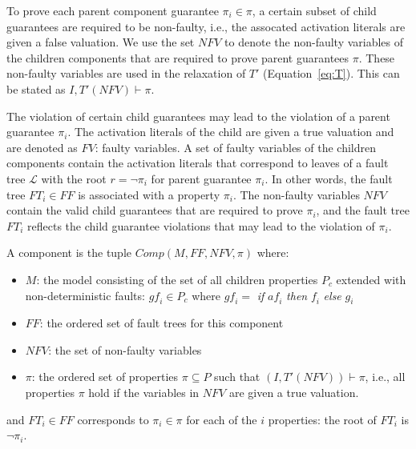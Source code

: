 
To prove each parent component guarantee $\pi_i \in \pi$, a certain subset of child guarantees are required to be non-faulty, i.e., the assocated activation literals are given a false valuation. We use the set $\mathit{NFV}$ to denote the non-faulty variables of the children components that are required to prove parent guarantees $\pi$.  These non-faulty variables are used in the relaxation of $T'$ (Equation~\ref{eq:T}). This can be stated as $I,T'(\mathit{NFV}) \vdash \pi$. 

The violation of certain child guarantees may lead to the violation of a parent guarantee $\pi_i$. The activation literals of the child are given a true valuation and are denoted as $\mathit{FV}$: faulty variables. A set of faulty variables of the children components contain the activation literals that correspond to leaves of a fault tree $\mathcal{L}$ with the root $r = \neg \pi_i$ for parent guarantee $\pi_i$. In other words, the fault tree $\mathit{FT_i} \in \mathit{FF}$ is associated with a property $\pi_i$. The non-faulty variables $\mathit{NFV}$ contain the valid child guarantees that are required to prove $\pi_i$, and the fault tree $\mathit{FT_i}$ reflects the child guarantee violations that may lead to the violation of $\pi_i$.


\begin{definition}
A component is the tuple $\mathit{Comp}(M, \mathit{FF}, \mathit{NFV}, \pi)$ where:
\begin{itemize}[label=\textbullet]
\item $M$: the model consisting of the set of all children properties $P_c$ extended with non-deterministic faults: $\mathit{gf_i} \in P_c$ where $\mathit{gf_i} =$ \textit{if} $\mathit{af_i}$ \textit{then} $\mathit{f}_i$ \textit{else} $g_i$
\item $\mathit{FF}$: the ordered set of fault trees for this component
\item $\mathit{NFV}$: the set of non-faulty variables 
\item $\pi$: the ordered set of properties $\pi \subseteq P$ such that $(I, T'(\mathit{NFV})) \vdash \pi$, i.e., all properties $\pi$ hold if the variables in $\mathit{NFV}$ are given a true valuation.
\end{itemize}
and $\mathit{FT}_i \in \mathit{FF}$ corresponds to $\pi_i \in \pi$ for each of the $i$ properties: the root of $\mathit{FT_i}$ is $\neg \pi_i$. 
\end{definition}



